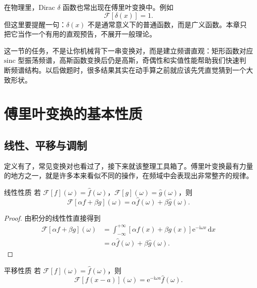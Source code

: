 \begin{zhu}{}{}
在物理里，Dirac $\delta$ 函数也常出现在傅里叶变换中。例如
\[
    \mathcal{F}[\delta(x)]=1.
\]
但这里要提醒一句：$\delta(x)$ 不是通常意义下的普通函数，而是广义函数。本章只把它当作一个有用的直观预告，不展开一般理论。
\end{zhu}

\begin{tishi}[本节小结]
这一节的任务，不是让你机械背下一串变换对，而是建立频谱直观：矩形函数对应 $\mathrm{sinc}$ 型振荡频谱，高斯函数变换后仍是高斯，奇偶性和实值性能帮助我们快速判断频谱结构。以后做题时，很多结果其实在动手算之前就应该先凭直觉猜到一个大致形状。
\end{tishi}

\section{傅里叶变换的基本性质}

\subsection{线性、平移与调制}

定义有了，常见变换对也看过了，接下来就该整理工具箱了。傅里叶变换最有力量的地方之一，就是许多本来看似不同的操作，在频域中会表现出非常整齐的规律。

\begin{dingli}{线性性质}{}
若 $\mathcal{F}[f](\omega)=\hat{f}(\omega)$，$\mathcal{F}[g](\omega)=\hat{g}(\omega)$，则
\begin{equation}
    \mathcal{F}[\alpha f+\beta g](\omega)
    =
    \alpha \hat{f}(\omega)+\beta \hat{g}(\omega).
\end{equation}
\end{dingli}

\begin{proof}
由积分的线性性直接得到
\begin{align}
    \mathcal{F}[\alpha f+\beta g](\omega)
    &=
    \int_{-\infty}^{+\infty}
    [\alpha f(x)+\beta g(x)]\mathrm{e}^{-\mathrm{i}\omega x}\,\mathrm{d}x \\
    &=
    \alpha \hat{f}(\omega)+\beta \hat{g}(\omega).
\end{align}
\end{proof}

\begin{dingli}{平移性质}{}
若 $\mathcal{F}[f](\omega)=\hat{f}(\omega)$，则
\begin{equation}
    \mathcal{F}[f(x-a)](\omega)=\mathrm{e}^{-\mathrm{i}\omega a}\hat{f}(\omega).
\end{equation}
\end{dingli}

